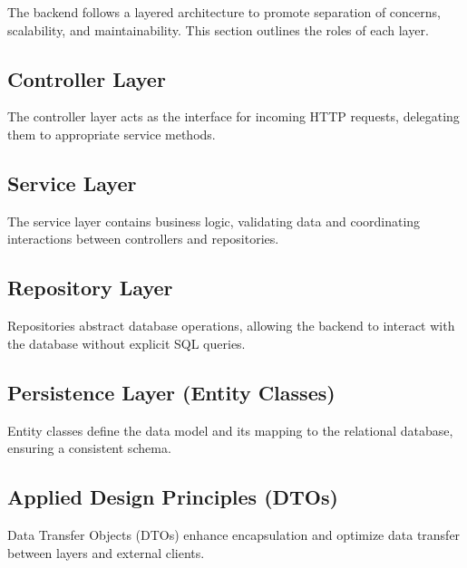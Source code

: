 \Author{\daAuthorThree}


    The backend follows a layered architecture to promote separation of concerns, scalability, and maintainability. This section outlines the roles of each layer.

    \subsection{Controller Layer}
    The controller layer acts as the interface for incoming HTTP requests, delegating them to appropriate service methods.

    \subsection{Service Layer}
    The service layer contains business logic, validating data and coordinating interactions between controllers and repositories.

    \subsection{Repository Layer}
    Repositories abstract database operations, allowing the backend to interact with the database without explicit SQL queries.

    \subsection{Persistence Layer (Entity Classes)}
    Entity classes define the data model and its mapping to the relational database, ensuring a consistent schema.

    \subsection{Applied Design Principles (DTOs)}
    Data Transfer Objects (DTOs) enhance encapsulation and optimize data transfer between layers and external clients.
